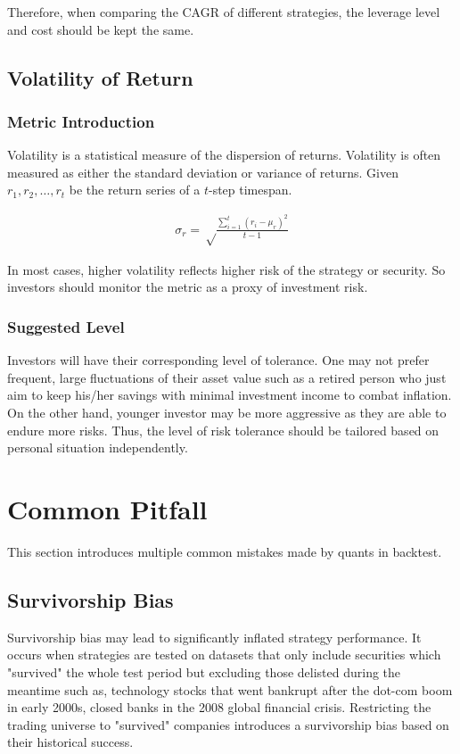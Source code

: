 \documentclass[12pt]{article}
\begin{document}
Therefore, when comparing the CAGR of different strategies, the leverage level and cost should be kept the same.

\subsection{Volatility of Return}

\subsubsection*{Metric Introduction}

Volatility is a statistical measure of the dispersion of returns. Volatility is often measured as either the standard deviation or variance of returns. Given $r_1, r_2, \dots , r_t$ be the return series of a $t$-step timespan.

\begin{align*}
  \sigma_r = \sqrt\frac{\sum_{i=1}^t (r_i-\mu_r)^2}{t-1}
\end{align*}

In most cases, higher volatility reflects higher risk of the strategy or security. So investors should monitor the metric as a proxy of investment risk.

\subsubsection*{Suggested Level}

Investors will have their corresponding level of tolerance. One may not prefer frequent, large fluctuations of their asset value such as a retired person who just aim to keep his/her savings with minimal investment income to combat inflation. On the other hand, younger investor may be more aggressive as they are able to endure more risks. Thus, the level of risk tolerance should be tailored based on personal situation independently.


\section{Common Pitfall}

This section introduces multiple common mistakes made by quants in backtest.

\subsection{Survivorship Bias}

Survivorship bias may lead to significantly inflated strategy performance. It occurs when strategies are tested on datasets that only include securities which "survived" the whole test period but excluding those delisted during the meantime such as, technology stocks that went bankrupt after the dot-com boom in early 2000s, closed banks in the 2008 global financial crisis. Restricting the trading universe to "survived" companies introduces a survivorship bias based on their historical success.
\end{document}
